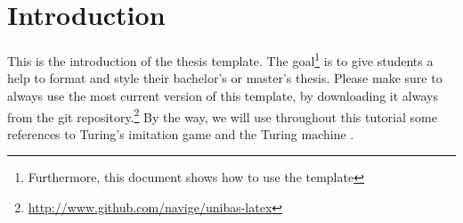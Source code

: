 \chapter{Introduction}

This is the introduction of the thesis template. The goal\footnote{Furthermore, this document shows how to use the template} is to give students a help to format and style their bachelor's or master's thesis. Please make sure to always use the most current version of this template, by downloading it always from the git repository.\footnote{\url{http://www.github.com/navige/unibas-latex}} By the way, we will use throughout this tutorial some references to Turing's imitation game \cite{turing:1950} and the Turing machine \cite{turing:1936}.

